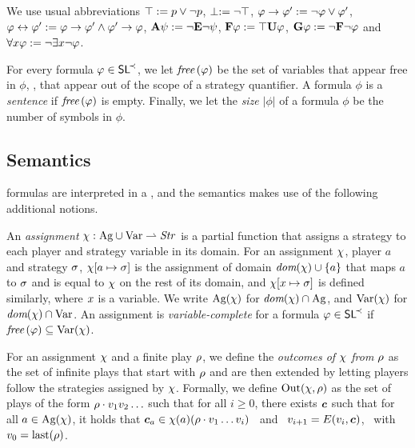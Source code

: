 We use usual abbreviations $\top:= p\vee\neg p$, $\perp:=\neg\top$, $\varphi\to\varphi':= \neg \varphi \vee \varphi'$,
$\varphi\leftrightarrow\varphi':= \varphi\to\varphi'\wedge \varphi'\to\varphi$,
${\bf A}\psi:= \neg {\bf E} \neg\psi$,
 ${\bf F}\varphi := \top {\bf U} \varphi$,   ${\bf G}\varphi := \neg {\bf F}
\neg \varphi$ and
 $\forall x\varphi:=\neg\exists x\neg\varphi$. %

For every formula $\varphi\in\textnormal{{\sffamily SL}}^{\!\prec}$, we let  $\textit{free}\,(\varphi)$ be the set of variables that appear
free in $\phi$, \ie, that
appear out of the scope of a strategy quantifier. A formula $\phi$ is a \emph{sentence} if $\textit{free}\,(\varphi)$ is empty.
Finally, we let the \emph{size} $|\phi|$ of a formula $\phi$ be the
number of symbols in $\phi$.


\subsection{Semantics}
\label{sec-SLmodels}

 \SLref formulas are interpreted in a \CGS, and the semantics makes
 use of the following additional notions.

An \emph{assignment}  $\chi:\textnormal{Ag}\cup\textnormal{Var} \rightharpoonup \mbox{\emph{Str}}$
is a partial function that assigns a strategy  to
each  player and strategy variable in its domain.
For an assignment
$\chi$, player $a$ and  strategy $\sigma$,
$\chi[a\mapsto\sigma]$ is the assignment of domain
$\textit{dom}(\chi)\cup\{a\}$ that maps $a$ to $\sigma$ and is equal to
$\chi$ on the rest of its domain, and 
$\chi[x\mapsto \sigma]$ is defined similarly, where $x$ is a
variable. %
We write $\textnormal{Ag}(\chi)$ for $\textit{dom}(\chi)\cap \textnormal{Ag}$, and
$\textnormal{Var}(\chi)$ for $\textit{dom}(\chi)\cap\textnormal{Var}$.
An assignment is
\emph{variable-complete} for a formula $\varphi\in\textnormal{{\sffamily SL}}^{\!\prec}$ if
 $\textit{free}\,(\varphi)\subseteq\textnormal{Var}(\chi)$.

For an assignment $\chi$ and a finite play $\rho$, we define the
\emph{outcomes of $\chi$ from $\rho$}
as the set of infinite plays that start with
$\rho$ and are then extended by letting players follow the strategies
assigned by $\chi$. Formally,
we define $\textnormal{Out}(\chi,\rho)$ as the set of plays of the form $\rho \cdot
 v_{1}v_{2}\ldots$ such that for all $i\geq 0$, there exists
 $\bm{c}$ such that for all $a\in\textnormal{Ag}(\chi)$, it holds that
 $\bm{c}_a\in\chi(a)(\rho\cdot v_{1}\ldots v_i)$ \mbox{ and }
 $v_{i+1}=E(v_{i},\bm{c})$, \mbox{ with }
 $v_{0}=\mbox{last}(\rho)$.
 

